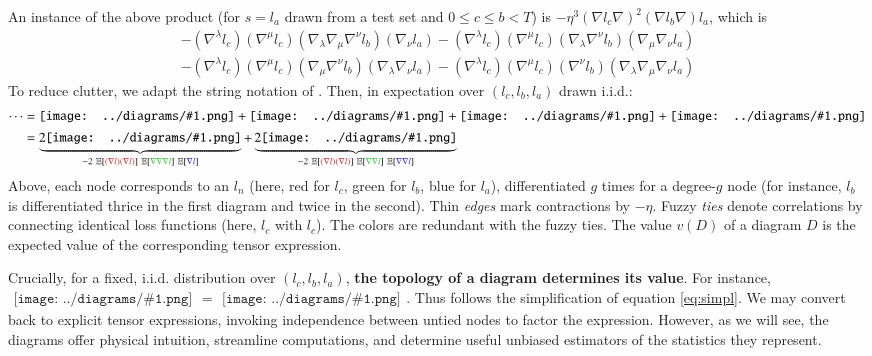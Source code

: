 \documentclass{article}
\newcommand{\expct}[1]{\mathbb{E}\left[#1\right]}
\newcommand{\sdia}[1]{\begin{gathered}\texttt{[image: ../diagrams/\#1.png]}\end{gathered}}
\begin{document}
    An instance of the above product (for $s=l_a$ drawn from a test set and
    $0\leq c\leq b<T$) is
    $-\eta^3 (\nabla l_c \nabla)^2 (\nabla l_b \nabla) l_a$, which is
    {\small
    \begin{align*}
        - (\nabla^\lambda l_c) (\nabla^\mu l_c) (\nabla_\lambda \nabla_\mu \nabla^\nu l_b) (\nabla_\nu l_a)   
        - (\nabla^\lambda l_c) (\nabla^\mu l_c) (\nabla_\lambda \nabla^\nu l_b) (\nabla_\mu \nabla_\nu l_a) \\
        - (\nabla^\lambda l_c) (\nabla^\mu l_c) (\nabla_\mu \nabla^\nu l_b) (\nabla_\lambda \nabla_\nu l_a)   
        - (\nabla^\lambda l_c) (\nabla^\mu l_c) (\nabla^\nu l_b) (\nabla_\lambda \nabla_\mu \nabla_\nu l_a)
    \end{align*}
    }
    To reduce clutter, we adapt the string notation of \citet{pe71}.  Then, in
    expectation over $(l_c, l_b, l_a)$ drawn i.i.d.:
    \begin{align}
        \cdots
        &= 
             \sdia{(01-2-3)(02-12-23)}
            +\sdia{(01-2-3)(02-13-23)}
            +\sdia{(01-2-3)(03-12-23)}
            +\sdia{(01-2-3)(03-13-23)} \\
            \label{eq:simpl}
        &=
            \underbrace{2\sdia{(01-2-3)(02-12-23)}}_{
               -2~\expct{{\color{moor}(\nabla l)(\nabla l)}}~\expct{{\color{moog}\nabla\nabla\nabla l}}~\expct{{\color{moob} \nabla l}}
            }
            +
            \underbrace{2\sdia{(01-2-3)(02-13-23)}}_{
               -2~\expct{{\color{moor}(\nabla l)(\nabla l)}}~\expct{{\color{moog}\nabla \nabla l}}~\expct{{\color{moob}\nabla \nabla l}}
            }
    \end{align}
    Above, each node corresponds to an $l_n$ (here, red for $l_c$, green
    for $l_b$, blue for $l_a$), differentiated $g$ times for a degree-$g$ node
    (for instance, $l_b$ is differentiated thrice in the first diagram and
    twice in the second).  Thin \emph{edges} mark contractions by $-\eta$.
    Fuzzy \emph{ties} denote correlations by connecting identical loss
    functions (here, $l_c$ with $l_c$).  The colors are redundant with the
    fuzzy ties.  The value $v(D)$ of a diagram $D$ is the expected value of the
    corresponding tensor expression.
    
    Crucially, for a fixed, i.i.d.  distribution over $(l_c, l_b, l_a)$, {\bf
    the topology of a diagram determines its value}.  For instance,
    $\sdia{(01-2-3)(02-12-23)} = \sdia{(01-2-3)(03-13-23)}$.  Thus follows the
    simplification of equation \ref{eq:simpl}.  We may convert back to explicit
    tensor expressions, invoking independence between untied nodes to factor
    the expression.  However, as we will see, the diagrams offer physical
    intuition, streamline computations, and determine useful unbiased
    estimators of the statistics they represent.  
\end{document}
